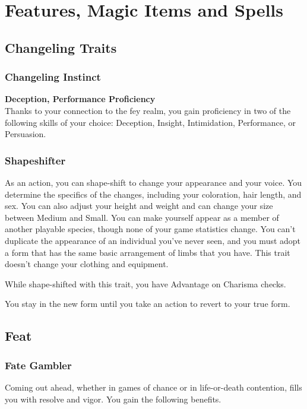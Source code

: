 \documentclass[letterpaper,openany,oneside,twocolumn]{book}
\begin{document}
\onecolumn


\rendercharactersheet

\renderbackgroundsheet

\renderspellsheet


\restoregeometry
\twocolumn

\chapter*{Features, Magic Items and Spells}
\section*{Changeling Traits}
\subsection*{Changeling Instinct}
\textbf{Deception, Performance Proficiency}\\
Thanks to your connection to the fey realm, you gain proficiency in two of the following skills of your choice: Deception, Insight, Intimidation, Performance, or Persuasion.
\subsection*{Shapeshifter}
As an action, you can shape-shift to change your appearance and your voice. You determine the specifics of the changes, including your coloration, hair length, and sex. You can also adjust your height and weight and can change your size between Medium and Small. You can make yourself appear as a member of another playable species, though none of your game statistics change. You can't duplicate the appearance of an individual you've never seen, and you must adopt a form that has the same basic arrangement of limbs that you have. This trait doesn't change your clothing and equipment.

While shape-shifted with this trait, you have Advantage on Charisma checks.

You stay in the new form until you take an action to revert to your true form.

\section*{Feat}
\subsection*{Fate Gambler}
Coming out ahead, whether in games of chance or in life-or-death contention, fills you with resolve and vigor. You gain the following benefits.
\end{document}
